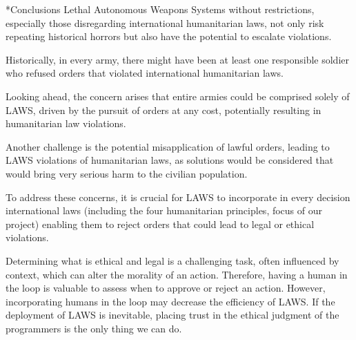 \documentclass[twocolumn, a4paper,10pt]{article}
\makeatletter
\renewcommand\section{\@startsection{section}{1}{\z@}{3pt}{3pt}{\normalfont\large\bfseries}}
\makeatother
\begin{document}
\section*{Conclusions}
Lethal Autonomous Weapons Systems without restrictions, especially those disregarding international humanitarian laws, not only risk repeating historical horrors but also have the potential to escalate violations. 

Historically, in every army, there might have been at least one responsible soldier who refused orders that violated international humanitarian laws. 

Looking ahead, the concern arises that entire armies could be comprised solely of LAWS, driven by the pursuit of orders at any cost, potentially resulting in humanitarian law violations. 

Another challenge is the potential misapplication of lawful orders, leading to LAWS violations of humanitarian laws, as solutions would be considered that would bring very serious harm to the civilian population.

To address these concerns, it is crucial for LAWS to incorporate in every decision international laws (including the four humanitarian principles, focus of our project) enabling them to reject orders that could lead to legal or ethical violations.

Determining what is ethical and legal is a challenging task, often influenced by context, which can alter the morality of an action. Therefore, having a human in the loop is valuable to assess when to approve or reject an action. However, incorporating humans in the loop may decrease the efficiency of LAWS. If the deployment of LAWS is inevitable, placing trust in the ethical judgment of the programmers is the only thing we can do.

\nocite{*}


\newpage
\onecolumn
\end{document}
